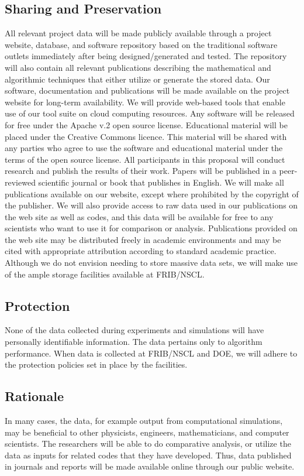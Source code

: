 \documentclass[11pt]{article}
\begin{document}
\subsection{Sharing and Preservation}
All relevant project data will be made publicly available through a project website, database,
and software repository based on the traditional software outlets immediately after being designed/generated and tested. The repository will also contain all relevant publications describing
the mathematical and algorithmic techniques that either utilize or generate the stored data. Our
software, documentation and publications will be made available on the project website for long-term
availability. We will provide web-based tools that enable use of our tool suite on cloud computing
resources. Any software will be released for
free under the Apache v.2 open source license. Educational material will be placed under the Creative Commons licence. This material will be shared with any parties who agree to
use the software and educational material under the terms of the open source license. All participants in this proposal will
conduct research and publish the results of their work. Papers will be published in a peer-reviewed
scientific journal or book that publishes in English. We will
make all publications available on our website, except where prohibited by the copyright of the
publisher. We will also provide access to raw data used in our publications on the web site as well as codes, and
this data will be available for free to any scientists who want to use it for comparison or analysis.
Publications provided on the web site may be distributed freely in academic environments and
may be cited with appropriate attribution according to standard academic practice. Although we
do not envision needing to store massive data sets, we will make use of the ample storage facilities
available at FRIB/NSCL.
\subsection{Protection}
None of the data collected during experiments and simulations will have personally identifiable
information. The data pertains only to algorithm performance. When data is collected at FRIB/NSCL
and DOE, we will adhere to the protection policies set in place by the facilities.
\subsection{Rationale}
In many cases, the data, for example output from computational simulations, may be beneficial to
other physicists, engineers, mathematicians, and computer scientists. The researchers will be able
to do comparative analysis, or utilize the data as inputs for related codes that they have developed.
Thus, data published in journals and reports will be made available online through our public
website.
\end{document}
